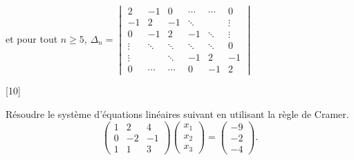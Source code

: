 \documentclass[letter,12pt]{exam}
\begin{document}
\begin{questions}
	et pour tout $n \geq 5$, $\Delta_n = \begin{vmatrix}
	2 & -1 & 0 & \cdots & \cdots & 0 \\
	-1 & 2 & -1 & \ddots &  & \vdots \\
	0 & -1 & 2 & -1 & \ddots & \vdots \\
	\vdots & \ddots & \ddots & \ddots & \ddots & 0 \\
	\vdots & & \ddots & -1 & 2 & -1\\
	0 & \cdots & \cdots & 0 & -1 & 2 
	\end{vmatrix}$ \\
	
	
	\vspace*{.5cm}
	[10] ~
	
	Résoudre le système d'équations linéaires suivant en utilisant la règle de Cramer.  
	$$\left(\begin{array}{rrr}
	1 & 2 & 4 \\
	0 & -2 & -1 \\
	1 & 1 & 3
	\end{array}\right)
	\left(\begin{array}{r}
	 x_{1} \\
	 x_{2} \\
	 x_{3}
	 \end{array}\right) = \left(\begin{array}{r}
	 -9 \\
	 -2 \\
	 -4
	 \end{array}\right).$$
	
	\begin{solutionorbox}
	\end{solutionorbox}
	

\end{questions}
\end{document}
